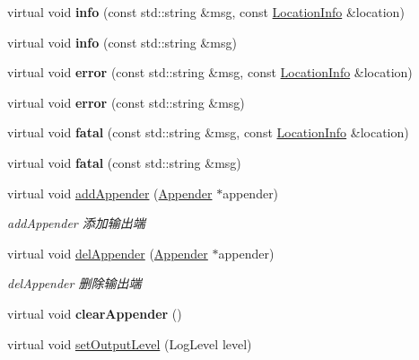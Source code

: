 \begin{DoxyCompactItemize}
virtual void {\bfseries info} (const std\+::string \&msg, const \hyperlink{classdaq_1_1LocationInfo}{Location\+Info} \&location)
\item 
\mbox{\label{classdaq_1_1Logger_ae57a4645fb16bd95d4324f5c105643cf}} 
virtual void {\bfseries info} (const std\+::string \&msg)
\item 
\mbox{\label{classdaq_1_1Logger_a580a9e143fe2962ba343f6c369ee8d3b}} 
virtual void {\bfseries error} (const std\+::string \&msg, const \hyperlink{classdaq_1_1LocationInfo}{Location\+Info} \&location)
\item 
\mbox{\label{classdaq_1_1Logger_a9fde9b26f081ab9c5b675b8f5e8b7b01}} 
virtual void {\bfseries error} (const std\+::string \&msg)
\item 
\mbox{\label{classdaq_1_1Logger_a0e7d924e0cbdf5d4d825af3467b8abea}} 
virtual void {\bfseries fatal} (const std\+::string \&msg, const \hyperlink{classdaq_1_1LocationInfo}{Location\+Info} \&location)
\item 
\mbox{\label{classdaq_1_1Logger_a02083da7b56324873c1789caf0aaed25}} 
virtual void {\bfseries fatal} (const std\+::string \&msg)
\item 
virtual void \hyperlink{classdaq_1_1Logger_a01e9511b12a573dcdfde97065faf8d08}{add\+Appender} (\hyperlink{classdaq_1_1Appender}{Appender} $\ast$appender)
\begin{DoxyCompactList}\small\item\em add\+Appender 添加输出端 \end{DoxyCompactList}\item 
virtual void \hyperlink{classdaq_1_1Logger_aefc5c7cc5ef32470682f6f5d9bf091a0}{del\+Appender} (\hyperlink{classdaq_1_1Appender}{Appender} $\ast$appender)
\begin{DoxyCompactList}\small\item\em del\+Appender 删除输出端 \end{DoxyCompactList}\item 
\mbox{\label{classdaq_1_1Logger_adc536e834a783094bad34b544d7d6f27}} 
virtual void {\bfseries clear\+Appender} ()
\item 
virtual void \hyperlink{classdaq_1_1Logger_aba27cec75533c4a625453a80d10d8f5b}{set\+Output\+Level} (Log\+Level level)

\end{DoxyCompactItemize}

